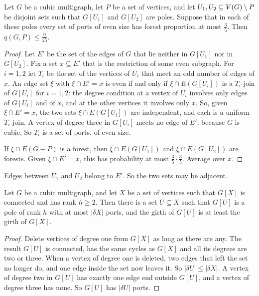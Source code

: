 \begin{lemma}[Product]\label{lem:product}
Let $G$ be a cubic multigraph, let $P$ be a set of vertices, and let $U_1,U_2\subseteq V(G)\setminus P$
be disjoint sets such that $G[U_1]$ and $G[U_2]$ are poles. Suppose that in each of these poles
every set of ports of even size has forest proportion at most $\frac35$. Then
$q(G,P)\le\frac9{25}$.
\end{lemma}

\begin{proof}
Let $E'$ be the set of the edges of $G$ that lie neither in $G[U_1]$ nor in $G[U_2]$. Fix a set
$x\subseteq E'$ that is the restriction of some even subgraph. For $i=1,2$ let $T_i$ be the set of
the vertices of $U_i$ that meet an odd number of edges of $x$. An edge set $\xi$ with
$\xi\cap E'=x$ is even if and only if $\xi\cap E(G[U_i])$ is a $T_i$-join of $G[U_i]$ for $i=1,2$:
the degree condition at a vertex of $U_i$ involves only edges of $G[U_i]$ and of $x$, and at the
other vertices it involves only $x$. So, given $\xi\cap E'=x$, the two sets $\xi\cap E(G[U_i])$ are
independent, and each is a uniform $T_i$-join. A vertex of degree three in $G[U_i]$ meets no edge
of $E'$, because $G$ is cubic. So $T_i$ is a set of ports, of even size.

If $\xi\cap E(G-P)$ is a forest, then $\xi\cap E(G[U_1])$ and $\xi\cap E(G[U_2])$ are forests. Given
$\xi\cap E'=x$, this has probability at most $\frac35\cdot\frac35$. Average over $x$.
\end{proof}

Edges between $U_1$ and $U_2$ belong to $E'$. So the two sets may be adjacent.

\begin{lemma}\label{lem:core}
Let $G$ be a cubic multigraph, and let $X$ be a set of vertices such that $G[X]$ is connected and
has rank $h\ge2$. Then there is a set $U\subseteq X$ such that $G[U]$ is a pole of rank $h$ with at
most $|\delta X|$ ports, and the girth of $G[U]$ is at least the girth of $G[X]$.
\end{lemma}

\begin{proof}
Delete vertices of degree one from $G[X]$ as long as there are any. The result $G[U]$ is connected,
has the same cycles as $G[X]$ and all its degrees are two or three. When a vertex of degree one is
deleted, two edges that left the set no longer do, and one edge inside the set now leaves it. So
$|\delta U|\le|\delta X|$. A vertex of degree two in $G[U]$ has exactly one edge end outside
$G[U]$, and a vertex of degree three has none. So $G[U]$ has $|\delta U|$ ports.
\end{proof}

